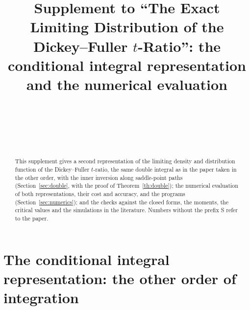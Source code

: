 \documentclass[ecta,nameyear,final,supplement]{econsocart}
\theoremstyle{plain}
\theoremstyle{definition}
\begin{document}
\begin{frontmatter}
\title{Supplement to ``The Exact Limiting Distribution of the Dickey--Fuller $t$-Ratio'': the conditional integral representation and the numerical evaluation}

\begin{aug}
\author[purdue]{~}
\author[hslu]{~}
\author[rotman,hkust]{~}
\address[purdue]{, }
\address[hslu]{, }
\address[rotman]{, }
\address[hkust]{, }
\end{aug}

\begin{abstract}
This supplement gives a second representation of the limiting density and distribution function of the Dickey--Fuller $t$-ratio, the same double integral as in the paper taken in the other order, with the inner inversion along saddle-point paths (Section~\ref{sec:double}, with the proof of Theorem~\ref{th:double}); the numerical evaluation of both representations, their cost and accuracy, and the programs (Section~\ref{sec:numerics}); and the checks against the closed forms, the moments, the critical values and the simulations in the literature.  Numbers without the prefix S refer to the paper.
\end{abstract}
\end{frontmatter}

\section{The conditional integral representation: the other order of integration}
\label{sec:double}
\end{document}
